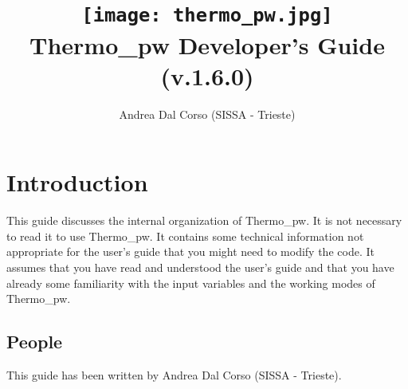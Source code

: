 \documentclass[12pt,a4paper,twoside]{report}
\def\version{1.6.0}
\def\tpw{{\sc Thermo\_pw}}
\begin{document}
 

\author{Andrea Dal Corso (SISSA - Trieste)}
\date{}

\title{
  \texttt{[image: thermo\_pw.jpg]} \\
  \vspace{3truecm}
  \Huge \color{dark-blue} {\sc Thermo}\_{\sc pw} Developer's Guide \\
  (v.\version)
}

\maketitle

\newpage

\tableofcontents

\newpage

{\color{dark-blue}\chapter{Introduction}}
\color{black}
This guide discusses the internal organization of \tpw. It is not necessary
to read it to use \tpw. It contains some technical information not 
appropriate for the user's guide that you might need to modify the code.
It assumes that you have read and understood the user's guide and that
you have already some familiarity with the input variables and 
the working modes of \tpw.

{\color{coral}\section{People}}
\color{black}
This guide has been written by Andrea Dal Corso (SISSA - Trieste). 
\end{document}
